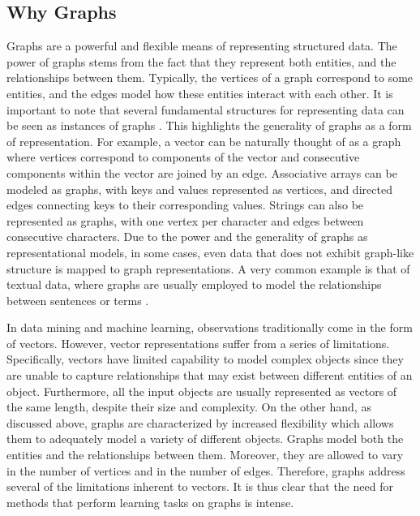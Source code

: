 \documentclass[twoside,11pt]{article}
\begin{document}
\subsection{Why Graphs}
Graphs are a powerful and flexible means of representing structured data.
The power of graphs stems from the fact that they represent both entities, and the relationships between them.
Typically, the vertices of a graph correspond to some entities, and the edges model how these entities interact with each other.
It is important to note that several fundamental structures for representing data can be seen as instances of graphs .
This highlights the generality of graphs as a form of representation.
For example, a vector can be naturally thought of as a graph where vertices correspond to components of the vector and consecutive components within the vector are joined by an edge.
Associative arrays can be modeled as graphs, with keys and values represented as vertices, and directed edges connecting keys to their corresponding values.
Strings can also be represented as graphs, with one vertex per character and edges between consecutive characters.
Due to the power and the generality of graphs as representational models, in some cases, even data that does not exhibit graph-like structure is mapped to graph representations.
A very common example is that of textual data, where graphs are usually employed to model the relationships between sentences or terms .

In data mining and machine learning, observations traditionally come in the form of vectors.
However, vector representations suffer from a series of limitations.
Specifically, vectors have limited capability to model complex objects since they are unable to capture relationships that may exist between different entities of an object.
Furthermore, all the input objects are usually represented as vectors of the same length, despite their size and complexity.
On the other hand, as discussed above, graphs are characterized by increased flexibility which allows them to adequately model a variety of different objects.
Graphs model both the entities and the relationships between them.
Moreover, they are allowed to vary in the number of vertices and in the number of edges.
Therefore, graphs address several of the limitations inherent to vectors.
It is thus clear that the need for methods that perform learning tasks on graphs is intense.
\end{document}
